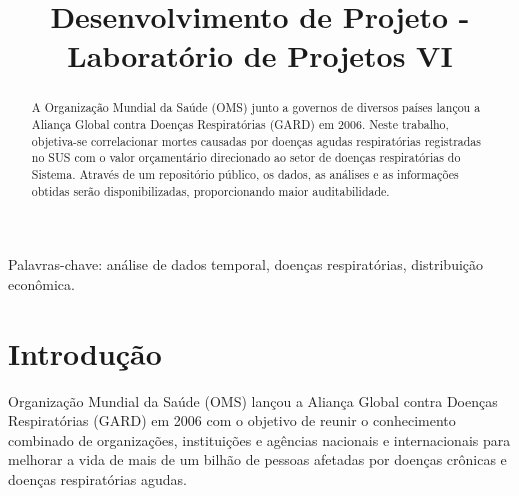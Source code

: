 \documentclass[journal]{IEEEtran}
\begin{document}
\title{Desenvolvimento de Projeto - Laboratório de Projetos VI}

\author{
\and
{}
\and
{}
}


%

\maketitle

\begin{abstract}

A Organização Mundial da Saúde (OMS) junto a governos de diversos países lançou a Aliança Global contra Doenças Respiratórias (GARD) em 2006. Neste trabalho, objetiva-se correlacionar mortes causadas por doenças agudas respiratórias registradas no SUS com o valor orçamentário direcionado ao setor de doenças respiratórias do Sistema. Através de um repositório público, os dados, as análises e as informações obtidas serão disponibilizadas, proporcionando maior auditabilidade.
\end{abstract}


\begin{IEEEkeywords}
Palavras-chave: análise de dados temporal, doenças respiratórias, distribuição econômica.
\end{IEEEkeywords}

\IEEEpeerreviewmaketitle

\section{Introdução}

 {Organização} Mundial da Saúde (OMS) lançou a Aliança Global contra Doenças Respiratórias (GARD) em 2006 com o objetivo de reunir o conhecimento combinado de organizações, instituições e agências nacionais e internacionais para melhorar a vida de mais de um bilhão de pessoas afetadas por doenças crônicas e doenças respiratórias agudas\cite{firs}.
\end{document}
